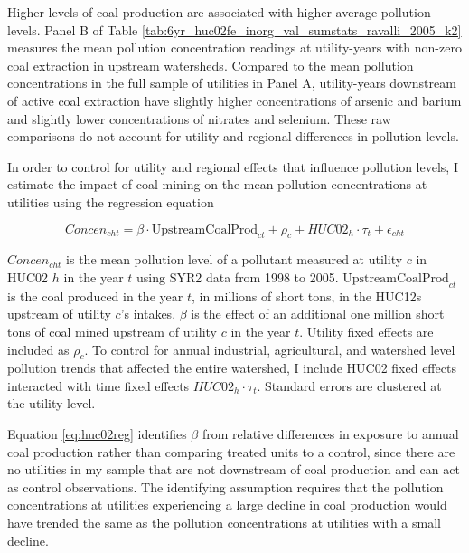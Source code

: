 \documentclass[12pt]{article}
\begin{document}
Higher levels of coal production are associated with higher average pollution levels. Panel B of Table \ref{tab:6yr_huc02fe_inorg_val_sumstats_ravalli_2005_k2} measures the mean pollution concentration readings at utility-years with non-zero coal extraction in upstream watersheds. Compared to the mean pollution concentrations in the full sample of utilities in Panel A, utility-years downstream of active coal extraction have slightly higher concentrations of arsenic and barium and slightly lower concentrations of nitrates and selenium. These raw comparisons do not account for utility and regional differences in pollution levels.

In order to control for utility and regional effects that influence pollution levels, I estimate the impact of coal mining on the mean pollution concentrations at utilities using the regression equation

\begin{equation}\label{eq:huc02reg}
    \textit{Concen}_{cht}= \beta\cdot\text{UpstreamCoalProd}_{ct} + \rho_c + HUC02_h\cdot\tau_t + \epsilon_{cht}
\end{equation}

$\textit{Concen}_{cht}$ is the mean pollution level of a pollutant measured at utility $c$ in HUC02 $h$ in the year $t$ using SYR2 data from 1998 to 2005. $\text{UpstreamCoalProd}_{ct}$ is the coal produced in the year $t$, in millions of short tons, in the HUC12s upstream of utility $c$'s intakes. $\beta$ is the effect of an additional one million short tons of coal mined upstream of utility $c$ in the year $t$. Utility fixed effects are included as $\rho_c$. To control for annual industrial, agricultural, and watershed level pollution trends that affected the entire watershed, I include HUC02 fixed effects interacted with time fixed effects $HUC02_h\cdot\tau_t$. Standard errors are clustered at the utility level.

Equation \ref{eq:huc02reg} identifies $\beta$ from relative differences in exposure to annual coal production rather than comparing treated units to a control, since there are no utilities in my sample that are not downstream of coal production and can act as control observations. The identifying assumption requires that the pollution concentrations at utilities experiencing a large decline in coal production would have trended the same as the pollution concentrations at utilities with a small decline. %

\end{document}
